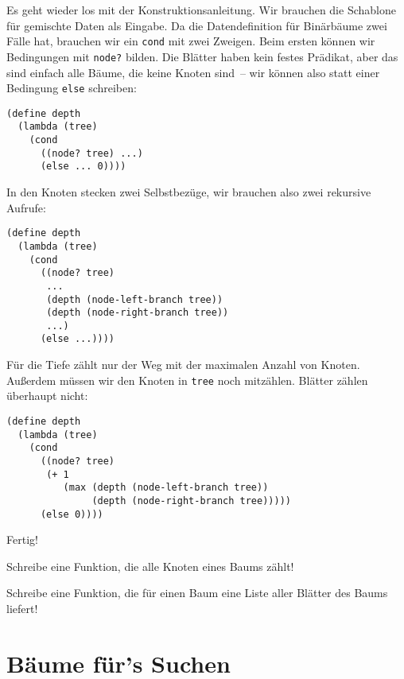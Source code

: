 Es geht wieder los mit der Konstruktionsanleitung.  Wir brauchen die
Schablone für gemischte Daten als Eingabe.  Da die Datendefinition für
Binärbäume zwei Fälle hat, brauchen wir ein \lstinline{cond} mit zwei
Zweigen.  Beim ersten können wir Bedingungen mit \lstinline{node?}
bilden.  Die Blätter haben kein festes Prädikat, aber das sind einfach
alle Bäume, die keine Knoten sind~-- wir können also statt einer
Bedingung \lstinline{else} schreiben:
%
\begin{lstlisting}
(define depth
  (lambda (tree)
    (cond
      ((node? tree) ...)
      (else ... 0))))
\end{lstlisting}
%
In den Knoten stecken zwei Selbstbezüge, wir brauchen also zwei
rekursive Aufrufe:
%
\begin{lstlisting}
(define depth
  (lambda (tree)
    (cond
      ((node? tree)
       ...
       (depth (node-left-branch tree))
       (depth (node-right-branch tree))
       ...)
      (else ...))))
\end{lstlisting}
%
Für die Tiefe zählt nur der Weg mit der maximalen Anzahl von Knoten.
Außerdem müssen wir den Knoten in \lstinline{tree} noch mitzählen.
Blätter zählen überhaupt nicht:
%
\begin{lstlisting}
(define depth
  (lambda (tree)
    (cond
      ((node? tree)
       (+ 1
          (max (depth (node-left-branch tree))
               (depth (node-right-branch tree)))))
      (else 0))))
\end{lstlisting}
%
Fertig!
%
\begin{aufgabeinline}
  Schreibe eine Funktion, die alle Knoten eines Baums zählt!
\end{aufgabeinline}
\begin{aufgabeinline}
  Schreibe eine Funktion, die für einen Baum eine Liste aller Blätter
  des Baums liefert!
\end{aufgabeinline}

\section{Bäume für's Suchen}
\label{sec:search-trees}

